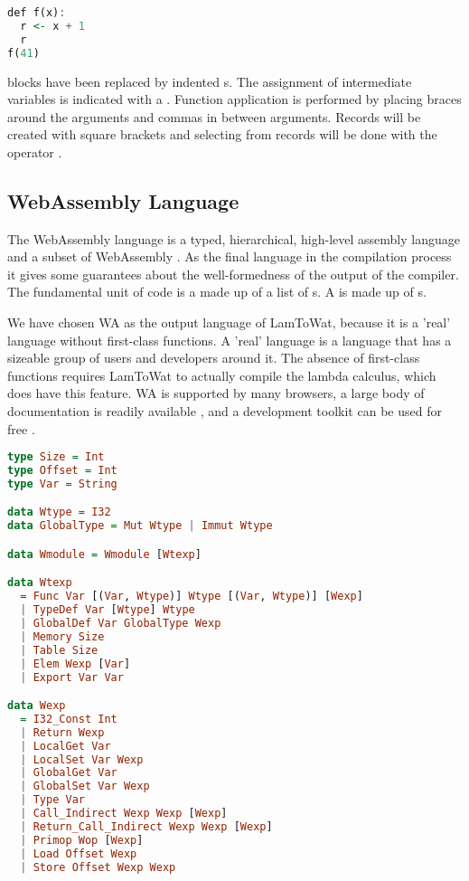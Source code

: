 {\begin{lstlisting}[language=Haskell]
def f(x):
  r <- x + 1
  r
f(41)
\end{lstlisting}

 blocks have been replaced by indented s. The assignment of intermediate variables is indicated with a \icode{<-}. Function application is performed by placing braces around the arguments and commas in between arguments. Records will be created with square brackets \icode{[1,2,3]} and selecting from records will be done with the operator \icode{!!}.

\subsection{\label{subsection:webdata}WebAssembly Language}
The WebAssembly language is a typed, hierarchical, high-level assembly language and a subset of WebAssembly \autocite{webassemblyhomepage}. As the final language in the compilation process it gives some guarantees about the well-formedness of the output of the compiler. The fundamental unit of code is a  made up of a list of s. A  is made up of s.

We have chosen \ac{WA} as the output language of LamToWat, because it is a 'real' language without first-class functions. A 'real' language is a language that has a sizeable group of users and developers around it. The absence of first-class functions requires LamToWat to actually compile the lambda calculus, which does have this feature. \ac{WA} is supported by many browsers, a large body of documentation is readily available \autocite{webassemblydocs}, and a development toolkit can be used for free \autocite{wabt}.

\begin{lstlisting}[language=Haskell]
type Size = Int
type Offset = Int
type Var = String

data Wtype = I32
data GlobalType = Mut Wtype | Immut Wtype

data Wmodule = Wmodule [Wtexp]

data Wtexp
  = Func Var [(Var, Wtype)] Wtype [(Var, Wtype)] [Wexp]
  | TypeDef Var [Wtype] Wtype
  | GlobalDef Var GlobalType Wexp
  | Memory Size
  | Table Size
  | Elem Wexp [Var]
  | Export Var Var

data Wexp
  = I32_Const Int
  | Return Wexp
  | LocalGet Var
  | LocalSet Var Wexp
  | GlobalGet Var
  | GlobalSet Var Wexp
  | Type Var
  | Call_Indirect Wexp Wexp [Wexp]
  | Return_Call_Indirect Wexp Wexp [Wexp]
  | Primop Wop [Wexp]
  | Load Offset Wexp
  | Store Offset Wexp Wexp


\end{lstlisting}}
